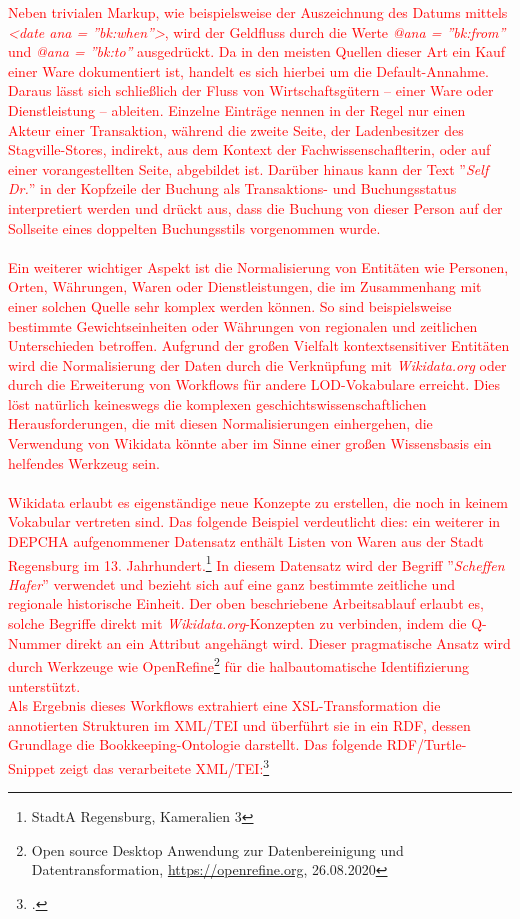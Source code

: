\documentclass[12pt,a4paper]{article}
\begin{document}
\textcolor{red}{
Neben trivialen Markup, wie beispielsweise der Auszeichnung des Datums mittels
\textit{<date ana = ''bk:when''>}, wird der Geldfluss durch die Werte \textit{@ana = ''bk:from''} und \textit{@ana = ''bk:to''} ausgedrückt. Da in den meisten Quellen dieser Art ein Kauf einer Ware dokumentiert ist, handelt es sich hierbei um die Default-Annahme. Daraus lässt sich schließlich der Fluss von Wirtschaftsgütern -- einer Ware oder Dienstleistung -- ableiten. Einzelne Einträge nennen in der Regel nur einen Akteur einer Transaktion, während die zweite Seite, der Ladenbesitzer des Stagville-Stores, indirekt, aus dem Kontext der Fachwissenschaflterin, oder auf einer vorangestellten Seite, abgebildet ist. Darüber hinaus kann der Text ''\textit{Self Dr.}'' in der Kopfzeile der Buchung als Transaktions- und Buchungsstatus interpretiert werden und drückt aus, dass die Buchung von dieser Person auf der Sollseite eines doppelten Buchungsstils vorgenommen wurde.
\\
\\
Ein weiterer wichtiger Aspekt ist die Normalisierung von Entitäten wie Personen, Orten, Währungen, Waren oder Dienstleistungen, die im Zusammenhang mit einer solchen Quelle sehr komplex werden können. So sind beispielsweise bestimmte Gewichtseinheiten oder Währungen von regionalen und zeitlichen Unterschieden betroffen. Aufgrund der großen Vielfalt kontextsensitiver Entitäten wird die Normalisierung der Daten durch die Verknüpfung mit \textit{Wikidata.org} oder durch die Erweiterung von Workflows für andere LOD-Vokabulare erreicht. Dies löst natürlich keineswegs die komplexen geschichtswissenschaftlichen Herausforderungen, die mit diesen Normalisierungen einhergehen, die Verwendung von Wikidata könnte aber im Sinne einer großen Wissensbasis ein helfendes Werkzeug sein.
\\
\\
Wikidata erlaubt es eigenständige neue Konzepte zu erstellen, die noch in keinem Vokabular vertreten sind. Das folgende Beispiel verdeutlicht dies: ein weiterer in DEPCHA aufgenommener Datensatz enthält Listen von Waren aus der Stadt Regensburg im 13. Jahrhundert.\footnote{StadtA Regensburg, Kameralien 3} In diesem Datensatz wird der Begriff ''\textit{Scheffen Hafer}'' verwendet und bezieht sich auf eine ganz bestimmte zeitliche und regionale historische Einheit. Der oben beschriebene Arbeitsablauf erlaubt es, solche Begriffe direkt mit \textit{Wikidata.org}-Konzepten zu verbinden, indem die Q-Nummer direkt an ein Attribut angehängt wird. Dieser pragmatische Ansatz wird durch Werkzeuge wie OpenRefine\footnote{Open source Desktop Anwendung zur Datenbereinigung und Datentransformation, \url{https://openrefine.org}, 26.08.2020} für die halbautomatische Identifizierung unterstützt.
\\
Als Ergebnis dieses Workflows extrahiert eine XSL-Transformation die annotierten Strukturen im XML/TEI und überführt sie in ein RDF, dessen Grundlage die Bookkeeping-Ontologie darstellt. Das folgende RDF/Turtle-Snippet zeigt das verarbeitete XML/TEI:\footcite[][S.10-15]{pollin2019digital}
}
\end{document}
